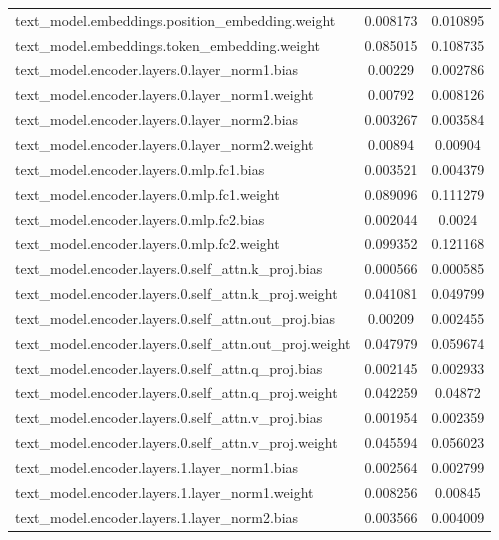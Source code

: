 \begin{longtable}{lcc}
\bottomrule
\endlastfoot
text\_model.embeddings.position\_embedding.weight & 0.008173 & 0.010895 \\
text\_model.embeddings.token\_embedding.weight & 0.085015 & 0.108735 \\
text\_model.encoder.layers.0.layer\_norm1.bias & 0.00229 & 0.002786 \\ 
text\_model.encoder.layers.0.layer\_norm1.weight & 0.00792 & 0.008126 \\
text\_model.encoder.layers.0.layer\_norm2.bias & 0.003267 & 0.003584 \\
text\_model.encoder.layers.0.layer\_norm2.weight & 0.00894 & 0.00904 \\
text\_model.encoder.layers.0.mlp.fc1.bias & 0.003521 & 0.004379 \\
text\_model.encoder.layers.0.mlp.fc1.weight & 0.089096 & 0.111279 \\
text\_model.encoder.layers.0.mlp.fc2.bias & 0.002044 & 0.0024 \\
text\_model.encoder.layers.0.mlp.fc2.weight & 0.099352 & 0.121168 \\
text\_model.encoder.layers.0.self\_attn.k\_proj.bias & 0.000566 & 0.000585 \\
text\_model.encoder.layers.0.self\_attn.k\_proj.weight & 0.041081 & 0.049799 \\
text\_model.encoder.layers.0.self\_attn.out\_proj.bias & 0.00209 & 0.002455 \\
text\_model.encoder.layers.0.self\_attn.out\_proj.weight & 0.047979 & 0.059674 \\
text\_model.encoder.layers.0.self\_attn.q\_proj.bias & 0.002145 & 0.002933 \\
text\_model.encoder.layers.0.self\_attn.q\_proj.weight & 0.042259 & 0.04872 \\
text\_model.encoder.layers.0.self\_attn.v\_proj.bias & 0.001954 & 0.002359 \\
text\_model.encoder.layers.0.self\_attn.v\_proj.weight & 0.045594 & 0.056023 \\
text\_model.encoder.layers.1.layer\_norm1.bias & 0.002564 & 0.002799 \\
text\_model.encoder.layers.1.layer\_norm1.weight & 0.008256 & 0.00845 \\
text\_model.encoder.layers.1.layer\_norm2.bias & 0.003566 & 0.004009 \\

\end{longtable}
